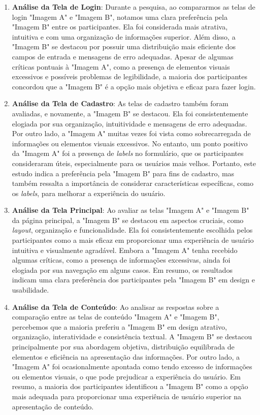\begin{enumerate}
    \item \textbf{Análise da Tela de Login}: Durante a pesquisa, ao compararmos as telas de login "Imagem A" e "Imagem B", notamos uma clara preferência pela "Imagem B" entre os participantes. Ela foi considerada mais atrativa, intuitiva e com uma organização de informações superior. Além disso, a "Imagem B" se destacou por possuir uma distribuição mais eficiente dos campos de entrada e mensagens de erro adequadas. Apesar de algumas críticas pontuais à "Imagem A", como a presença de elementos visuais excessivos e possíveis problemas de legibilidade, a maioria dos participantes concordou que a "Imagem B" é a opção mais objetiva e eficaz para fazer login.
    
    \item \textbf{Análise da Tela de Cadastro}: As telas de cadastro também foram avaliadas, e novamente, a "Imagem B" se destacou. Ela foi consistentemente elogiada por sua organização, intuitividade e mensagens de erro adequadas. Por outro lado, a "Imagem A" muitas vezes foi vista como sobrecarregada de informações ou elementos visuais excessivos. No entanto, um ponto positivo da "Imagem A" foi a presença de \textit{labels} no formulário, que os participantes consideraram úteis, especialmente para os usuários mais velhos. Portanto, este estudo indica a preferência pela "Imagem B" para fins de cadastro, mas também ressalta a importância de considerar características específicas, como os \textit{labels}, para melhorar a experiência do usuário.
    
    \item \textbf{Análise da Tela Principal}: Ao avaliar as telas "Imagem A" e "Imagem B" da página principal, a "Imagem B" se destacou em aspectos cruciais, como \textit{layout}, organização e funcionalidade. Ela foi consistentemente escolhida pelos participantes como a mais eficaz em proporcionar uma experiência de usuário intuitiva e visualmente agradável. Embora a "Imagem A" tenha recebido algumas críticas, como a presença de informações excessivas, ainda foi elogiada por sua navegação em alguns casos. Em resumo, os resultados indicam uma clara preferência dos participantes pela "Imagem B" em design e usabilidade.

    \item \textbf{Análise da Tela de Conteúdo}: Ao analisar as respostas sobre a comparação entre as telas de conteúdo "Imagem A" e "Imagem B", percebemos que a maioria preferiu a "Imagem B" em design atrativo, organização, interatividade e consistência textual. A "Imagem B" se destacou principalmente por sua abordagem objetiva, distribuição equilibrada de elementos e eficiência na apresentação das informações. Por outro lado, a "Imagem A" foi ocasionalmente apontada como tendo excesso de informações ou elementos visuais, o que pode prejudicar a experiência do usuário. Em resumo, a maioria dos participantes identificou a "Imagem B" como a opção mais adequada para proporcionar uma experiência de usuário superior na apresentação de conteúdo.
    
\end{enumerate}

